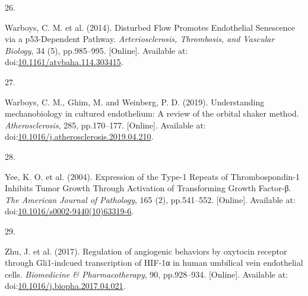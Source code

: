 \documentclass[
  11pt,
]{article}
\newlength{\cslhangindent}
\newlength{\csllabelwidth}
\newlength{\cslentryspacingunit} %
\newenvironment{CSLReferences}[2] %
 {%
  \setlength{\parindent}{0pt}
  \ifodd #1
  \let\oldpar\par
  \def\par{\hangindent=\cslhangindent\oldpar}
  \fi
  \setlength{\parskip}{#2\cslentryspacingunit}
 }%
 {}
\newcommand{\CSLLeftMargin}[1]{\parbox[t]{\csllabelwidth}{#1}}
\newcommand{\CSLRightInline}[1]{\parbox[t]{\linewidth - \csllabelwidth}{#1}\break}
\begin{document}
\begin{CSLReferences}{0}{0}
\leavevmode{}%
\CSLLeftMargin{26. }
\CSLRightInline{Warboys, C. M. {et al.} (2014). {Disturbed Flow Promotes Endothelial Senescence via a p53-Dependent Pathway}. \emph{Arteriosclerosis, Thrombosis, and Vascular Biology}, 34 (5), pp.985--995. {[}Online{]}. Available at: doi:\href{https://doi.org/10.1161/atvbaha.114.303415}{10.1161/atvbaha.114.303415}.}

\leavevmode{}%
\CSLLeftMargin{27. }
\CSLRightInline{Warboys, C. M., Ghim, M. and Weinberg, P. D. (2019). {Understanding mechanobiology in cultured endothelium: A review of the orbital shaker method}. \emph{Atherosclerosis}, 285, pp.170--177. {[}Online{]}. Available at: doi:\href{https://doi.org/10.1016/j.atherosclerosis.2019.04.210}{10.1016/j.atherosclerosis.2019.04.210}.}

\leavevmode{}%
\CSLLeftMargin{28. }
\CSLRightInline{Yee, K. O. {et al.} (2004). {Expression of the Type-1 Repeats of Thrombospondin-1 Inhibits Tumor Growth Through Activation of Transforming Growth Factor-β}. \emph{The American Journal of Pathology}, 165 (2), pp.541--552. {[}Online{]}. Available at: doi:\href{https://doi.org/10.1016/s0002-9440(10)63319-6}{10.1016/s0002-9440(10)63319-6}.}

\leavevmode{}%
\CSLLeftMargin{29. }
\CSLRightInline{Zhu, J. {et al.} (2017). {Regulation of angiogenic behaviors by oxytocin receptor through Gli1-indcued transcription of HIF-1α in human umbilical vein endothelial cells}. \emph{Biomedicine \& Pharmacotherapy}, 90, pp.928--934. {[}Online{]}. Available at: doi:\href{https://doi.org/10.1016/j.biopha.2017.04.021}{10.1016/j.biopha.2017.04.021}.}

\end{CSLReferences}
\end{document}
